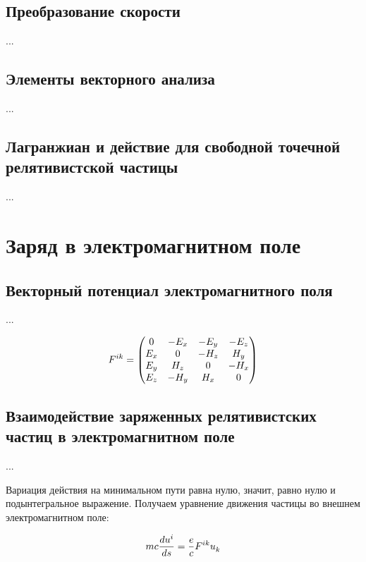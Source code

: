 \documentclass{article}
\begin{document}
\subsection{Преобразование скорости}

...

\subsection{Элементы векторного анализа}

...

\subsection{Лагранжиан и действие для свободной точечной релятивистской частицы}

...

\section{Заряд в электромагнитном поле}

\subsection{Векторный потенциал электромагнитного поля}

...

\begin{equation}\label{eq:fmatrix}
    \tensor{F}{^i^k} =
    \begin{pmatrix}
        0 & -E_x & -E_y & -E_z \\
        E_x & 0 & -H_z & H_y \\
        E_y & H_z & 0 & -H_x \\
        E_z & -H_y & H_x & 0
    \end{pmatrix}
\end{equation}

\subsection{Взаимодействие заряженных релятивистских частиц в электромагнитном поле}

...

Вариация действия на минимальном пути равна нулю, значит, равно нулю и подынтегральное выражение. Получаем уравнение движения частицы во внешнем электромагнитном поле:

\begin{equation}\label{eq:movement}
    mc\frac{d\tensor{u}{^i}}{ds}=\frac{e}{c}\tensor{F}{^i^k}\tensor{u}{_k}
\end{equation}
\end{document}
